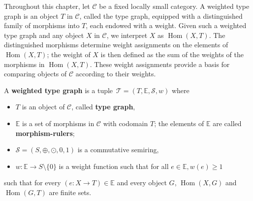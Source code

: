 Throughout this chapter, let \(\mathcal{C}\) be a fixed locally small category. A weighted type graph is an object \(T\) in \(\mathcal{C}\), called the type graph, equipped with a distinguished family of morphisms into \(T\), each endowed with a weight. Given such a weighted type graph and any object \(X\) in \(\mathcal{C}\), we interpret \(X\) as \(\operatorname{Hom}(X,T)\). The distinguished morphisms determine weight assignments on the elements of \(\operatorname{Hom}(X,T)\); the weight of \(X\) is then defined as the sum of the weights of the morphisms in \(\operatorname{Hom}(X,T)\). These weight assignments provide a basis for comparing objects of \(\mathcal{C}\) according to their weights.

\begin{definition}
    \label{wf:def:weighted_type_graph}
    A \textbf{weighted type graph} is a tuple~\(\mathcal{T} = (T, \mathbb{E}, \mathcal{S}, w)\) where
    \begin{itemize} 
        \item \(T\) is an object of $\mathcal{C}$, called \textbf{type graph},
        \item \(\mathbb{E}\) is a set of morphisms in $\mathcal{C}$ with codomain $T$; the elements of \(\mathbb{E}\) are called \textbf{morphism-rulers};
        \item \(\mathcal{S}=(S, \oplus, \odot, 0, 1)\) is a commutative semiring,
        \item \(w : \mathbb{E} \to S \setminus \{0\}\) is a weight function such that for all $e \in \mathbb{E}, w(e) \geq 1$
    \end{itemize}
    such that for every \( (e :X \to T) \in \mathbb{E}\) and every object \(G\), \(\operatorname{Hom}(X, G)\) and \(\operatorname{Hom}(G, T)\) are finite sets.
\end{definition}

